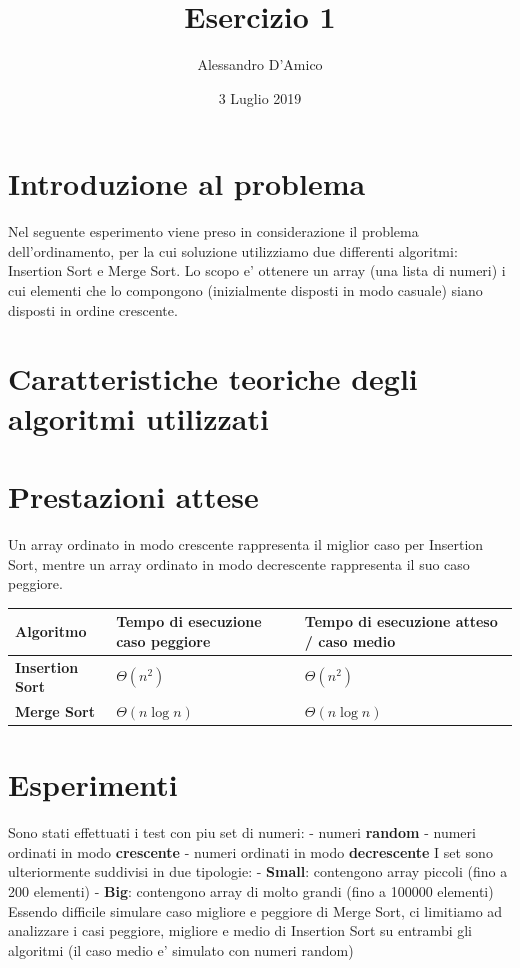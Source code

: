 \documentclass[a4paper]{article}
\title {{\TitleFont Esercizio 1}}
\date{3 Luglio 2019}
\author{{\AuthFont Alessandro D'Amico}}
\begin{document}
\begin{titlingpage}
\maketitle
\end{titlingpage}
\tableofcontents
\newpage
\section{Introduzione al problema}
Nel seguente esperimento viene preso in considerazione il problema dell'ordinamento, per la cui soluzione utilizziamo due differenti algoritmi: Insertion Sort e Merge Sort.
Lo scopo e' ottenere un array (una lista di numeri) i cui elementi che lo compongono (inizialmente disposti in modo casuale) siano disposti in ordine crescente.
\section{Caratteristiche teoriche degli algoritmi utilizzati}
\section{Prestazioni attese}
Un array ordinato in modo crescente rappresenta il miglior caso per Insertion Sort, mentre un array ordinato in modo decrescente rappresenta il suo caso peggiore.
\newline
\newline
	\begin{tabularx}{10cm}{|X|X|X|}
	\hline
	Algoritmo & Tempo di esecuzione caso peggiore & Tempo di esecuzione atteso / caso medio \\
	\hline
	\textbf{Insertion Sort} & $\Theta(n^2)$  & $\Theta(n^2)$ \\
	\hline
	\textbf{Merge Sort} &  $\Theta(n\log{}n)$ & $\Theta(n\log{}n)$\\
	\hline
	\end{tabularx}
\section{Esperimenti}
Sono stati effettuati i test con piu set di numeri: 
\newline
- numeri \textbf{random}
\newline 
- numeri ordinati in modo \textbf{crescente}
\newline
- numeri ordinati in modo \textbf{decrescente}
\newline
I set sono ulteriormente suddivisi in due tipologie: 
\newline
- \textbf{Small}: contengono array piccoli (fino a 200 elementi)
\newline
- \textbf{Big}: contengono array di molto grandi (fino a 100000 elementi)
\newline
\newline
Essendo difficile simulare caso migliore e peggiore di Merge Sort, ci limitiamo ad analizzare i casi peggiore, migliore e medio di Insertion Sort su entrambi gli algoritmi (il caso medio e' simulato con numeri random)
\end{document}
